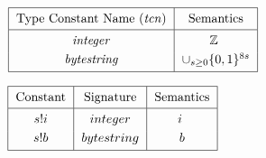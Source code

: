 \documentclass[../plutus-core-specification.tex]{subfiles}
\begin{document}
\vspace{1cm}


\begin{minipage}{\linewidth}
\centering

    \(\begin{tabular}{|c|c|}\hline
    \Strut
        \textrm{Type Constant Name (\textit{tcn})} & \textrm{Semantics}\\
        \hline
        \textit{integer} & $\mathbb{Z}$ \rule{0mm}{4mm}  \\[3pt]
        \textit{bytestring} & $\cup_{s \ge 0}\{0,1\}^{8s}$\\[3pt]
        \hline
   \end{tabular}\)
   \label{fig:type_constants}

\end{minipage}
\vspace{1cm}



\begin{minipage}{\linewidth}
\centering
   \(\begin{tabular}{|c|c|c|}\hline
    \Strut
        \textrm{Constant} & \textrm{Signature} & \textrm{Semantics}\\
        \hline
        $s!i$   & $\constsig{integer}$  &$i$ \rule{0mm}{4mm} \\[3pt]
        $s!b$   & $\constsig{bytestring}$ & $b$\\[3pt]
        \hline
    \end{tabular}\)
    \label{fig:constants}
\end{minipage}

\end{document}
